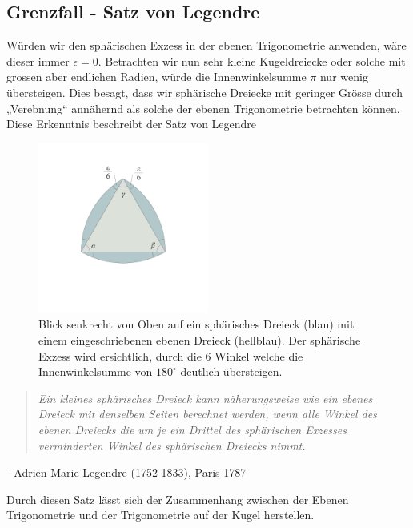 \begin{refsection}
\subsection{Grenzfall - Satz von Legendre}
Würden wir den sphärischen Exzess in der ebenen Trigonometrie anwenden, wäre dieser immer $\epsilon=0$. Betrachten wir nun sehr kleine Kugeldreiecke oder solche mit grossen aber endlichen Radien, würde die Innenwinkelsumme $\pi$ nur wenig übersteigen. Dies besagt, dass wir sphärische Dreiecke mit geringer Grösse durch „Verebnung“ annähernd als solche der ebenen Trigonometrie betrachten können. Diese Erkenntnis beschreibt der Satz von Legendre

\begin{figure}[htbp]
\centering
\includegraphics[width=0.5\textwidth]{kugel/SphaerischerExzess.jpg}
\caption{Blick senkrecht von Oben auf ein sphärisches Dreieck (blau) mit einem eingeschriebenen ebenen Dreieck (hellblau). Der sphärische Exzess wird ersichtlich, durch die 6 Winkel welche die Innenwinkelsumme von $180^{\circ}$ deutlich übersteigen.}
\end{figure}


\begin{quote} \textit{Ein kleines sphärisches Dreieck kann näherungsweise 
wie ein ebenes Dreieck mit denselben Seiten berechnet 
werden, wenn alle Winkel des ebenen Dreiecks die um 
je ein Drittel des sphärischen Exzesses verminderten 
Winkel des sphärischen Dreiecks nimmt.} \end{quote}
\begin{flushright} - Adrien-Marie Legendre (1752-1833), Paris 1787
\end{flushright}

Durch diesen Satz lässt sich der Zusammenhang zwischen der Ebenen Trigonometrie und der Trigonometrie auf der Kugel herstellen.




\end{refsection}
